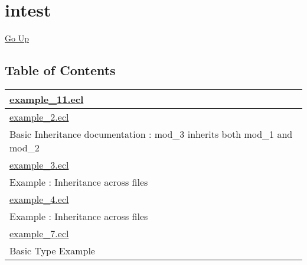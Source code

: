 \chapter*{\color{headtoc} intest}
\hypertarget{ecldoc:toc:root/intest}{}
\hyperlink{ecldoc:toc:}{Go Up}


\section*{Table of Contents}
{\renewcommand{\arraystretch}{1.5}
\begin{longtable}{|p{\textwidth}|}
\hline
\hyperlink{ecldoc:toc:intest.example_11}{example\_11.ecl} \\
\hline
\hyperlink{ecldoc:toc:intest.example_2}{example\_2.ecl} \\
Basic Inheritance documentation : mod\_3 inherits both mod\_1 and mod\_2 \\
\hline
\hyperlink{ecldoc:toc:intest.example_3}{example\_3.ecl} \\
Example : Inheritance across files \\
\hline
\hyperlink{ecldoc:toc:intest.example_4}{example\_4.ecl} \\
Example : Inheritance across files \\
\hline
\hyperlink{ecldoc:toc:intest.example_7}{example\_7.ecl} \\
Basic Type Example \\
\hline
\end{longtable}
}






